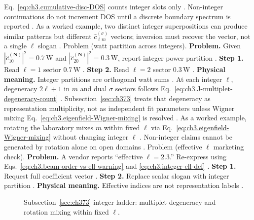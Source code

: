 Eq.~\eqref{eq:ch3.cumulative-disc-DOS} counts integer slots only \cite{hansen1988}. Non-integer
continuations do not increment DOS until a discrete boundary spectrum is reported \cite{stratton1941}.
As a worked example, two distinct integer superpositions can produce similar patterns but different \(\widehat{c}_{\ell m}^{(\sigma)}\) vectors;
inversion must recover the vector, not a single \(\ell\) slogan \cite{devaney2004}.
Problem (watt partition across integers). \textbf{Problem.} Given \(|\widehat{c}_{10}^{(\mathbf{N})}|^{2}=0.7\,\mathrm{W}\) and
\(|\widehat{c}_{20}^{(\mathbf{N})}|^{2}=0.3\,\mathrm{W}\), report integer power partition \cite{poynting1884}.
\textbf{Step 1.} Read \(\ell=1\) sector \(0.7\,\mathrm{W}\) \cite{hansen1988}.
\textbf{Step 2.} Read \(\ell=2\) sector \(0.3\,\mathrm{W}\) \cite{poynting1884}.
\textbf{Physical meaning.} Integer partitions are orthogonal watt sums \cite{stratton1941}.
At each integer \(\ell\), degeneracy \(2\ell+1\) in \(m\) and dual \(\sigma\) sectors follows
Eq.~\eqref{eq:ch3.J-multiplet-degeneracy-count} \cite{jackson1999}. Subsection~\ref{sec:ch373} treats that
degeneracy as representation multiplicity, not as independent fit parameters unless Wigner mixing
Eq.~\eqref{eq:ch3.eigenfield-Wigner-mixing} is resolved \cite{harrington2001}.
As a worked example, rotating the laboratory mixes \(m\) within fixed \(\ell\) via Eq.~\eqref{eq:ch3.eigenfield-Wigner-mixing} without changing
integer \(\ell\) \cite{jackson1999}. Non-integer claims cannot be generated by rotation alone on open domains
\cite{harrington2001}.
Problem (effective \(\ell\) marketing check). \textbf{Problem.} A vendor reports ``effective \(\ell=2.3\).'' Re-express using Eqs.~\eqref{eq:ch3.beam-order-vs-ell-warning}
and \eqref{eq:ch3.integer-ell-def} \cite{harrington2001}.
\textbf{Step 1.} Request full coefficient vector \cite{devaney2004}.
\textbf{Step 2.} Replace scalar slogan with integer partition \cite{harrington2001}.
\textbf{Physical meaning.} Effective indices are not representation labels \cite{stratton1941}.
\begin{figure}[t]
\centering
{}
\caption{Subsection~\ref{sec:ch373} integer ladder: multiplet degeneracy and rotation mixing within fixed \(\ell\).}
\label{fig:ch3.373-integer-ladder}
\end{figure}
